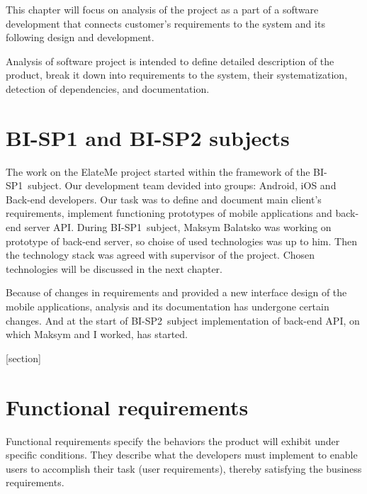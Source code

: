 This chapter will focus on analysis of the project as a part of a software development that connects customer's
requirements to the system and its following design and development.

Analysis of software project is intended to define detailed description of the product, break it down into
requirements to the system, their systematization, detection of dependencies, and documentation.


\section{BI-SP1 and BI-SP2 subjects}
The work on the ElateMe project started within the framework of the BI-SP1~subject. Our development team devided into
groups: Android, iOS and Back-end developers. Our task was to define and document main client's
requirements, implement functioning prototypes of mobile applications and back-end server \ac{API}. During
BI-SP1~subject, Maksym Balatsko was working on prototype of back-end server, so choise of used technologies was up to
him. Then the technology stack was agreed with supervisor of the project. Chosen technologies will be discussed in
the next chapter.

Because of changes in requirements and provided a new interface design of the mobile applications, analysis and its
documentation has undergone certain changes. And at the start of BI-SP2~subject implementation of back-end API,
on which Maksym and I worked, has started.


[section]
\newcommand{\req}[2]{
\par\stepcounter{reqcounter}
\indent\par
\textbf{#1\arabic{reqcounter}: #2}
}
\newcommand{\funcreq}[1]{\req{F}{#1}}
\newcommand{\nonfreq}[1]{\req{N}{#1}}

\section{Functional requirements}
Functional requirements specify the behaviors the product will exhibit under specific conditions. They describe what
the developers must implement to enable users to accomplish their task (user requirements), thereby satisfying the
business requirements. \cite{funcreq}

